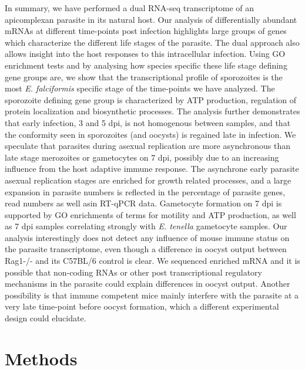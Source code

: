 \documentclass{bmcart}
\begin{document}
In summary, we have performed a dual RNA-seq transcriptome of an apicomplexan parasite in its natural host. Our analysis of differentially abundant mRNAs at different time-points post infection highlights large groups of genes which characterize the different life stages of the parasite. The dual approach also allows insight into the host responses to this intracellular infection. 
Using GO enrichment tests and by analysing how species specific these life stage defining gene groups are, we show that the transcriptional profile of sporozoites is the most \textit{E. falciformis} specific stage of the time-points we have analyzed. The sporozoite defining gene group is characterized by ATP production, regulation of protein localization and biosynthetic processes. The analysis further demonstrates that early infection, 3 and 5 dpi, is not homogenous between samples, and that the conformity seen in sporozoites (and oocysts) is regained late in infection. We speculate that parasites during asexual replication are more asynchronous than late stage merozoites or gametocytes on 7 dpi, possibly due to an increasing influence from the host adaptive immune response. The asynchrone early parasite asexual replication stages are enriched for growth related processes, and a large expansion in parasite numbers is reflected in the percentage of parasite genes, read numbers as well asin RT-qPCR data. Gametocyte formation on 7 dpi is supported by GO enrichments of terms for motility and ATP production, as well as 7 dpi samples correlating strongly with \textit{E. tenella} gametocyte samples.  
Our analysis interestingly does not detect any influence of mouse immune status on the parasite transcriptome, even though a difference in oocyst output between Rag1-/- and its C57BL/6 control is clear. We sequenced enriched mRNA and it is possible that non-coding RNAs or other post transcriptional regulatory mechanisms in the parasite could explain differences in oocyst output. Another possibility is that immune competent mice mainly interfere with the parasite at a very late time-point before oocyst formation, which a different experimental design could elucidate. 


\section{Methods}
\end{document}
